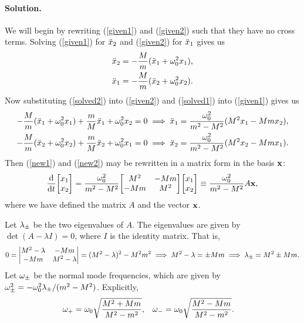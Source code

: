 \documentclass[11pt]{article}
\newcommand{\refeq}[1]{(\ref{#1})}
\newenvironment{solution}
{
    \paragraph{Solution.}
    \ignorespaces
}
{
    \bigskip
}
\begin{document}
\begin{solution}
	We will begin by rewriting \refeq{given1} and \refeq{given2} such that they have no cross terms.  Solving \refeq{given1} for $\ddot{x}_2$ and \refeq{given2} for $\ddot{x}_1$ gives us
	\begin{align}
		\ddot{x}_2 &= -\frac{M}{m} (\ddot{x}_1 + \omega_0^2 x_1), \label{solved2} \\
		\ddot{x}_1 &= -\frac{M}{m} (\ddot{x}_2 + \omega_0^2 x_2). \label{solved1}
	\end{align}
	Now substituting \refeq{solved2} into \refeq{given2} and \refeq{solved1} into \refeq{given1} gives us
	\begin{align}
		-\frac{M}{m} (\ddot{x}_1 + \omega_0^2 x_1) + \frac{m}{M} \ddot{x}_1 + \omega_0^2 x_2 = 0 &\implies \ddot{x}_1 = \frac{\omega_0^2}{m^2 - M^2} (M^2 x_1 - M m x_2), \label{new1} \\
		-\frac{M}{m} (\ddot{x}_2 + \omega_0^2 x_2) + \frac{m}{M} \ddot{x}_2 + \omega_0^2 x_1 = 0 &\implies \ddot{x}_2 = \frac{\omega_0^2}{m^2 - M^2} (M^2 x_2 - M m x_1). \label{new2}
	\end{align}
	Then \refeq{new1} and \refeq{new2} may be rewritten in a matrix form in the basis $\mathbf{x}$:
	\begin{align}
		\dv{}{t} \mqty[ \xq \\ \xw ] = \frac{\omo^2}{m^2 - M^2} \mqty[ M^2 & -Mm \\ -Mm & M^2 ] \mqty[ \xq \\ \xw ] \equiv \frac{\omo^2}{m^2 - M^2} A \vx,
	\end{align}
	where we have defined the matrix $A$ and the vector $\mathbf{x}$.
	
	Let $\lambda_\pm$ be the two eigenvalues of $A$.  The eigenvalues are given by $\det(A - \lambda I) = 0$, where $I$ is the identity matrix.  That is,
	\begin{align}
		0 = \mdet{M^2 - \lambda & -Mm \\ -Mm & M^2 - \lambda} = (M^2 - \lambda)^2 - M^2 m^2 \implies M^2 - \lambda = \pm Mm \implies \lmpm = M^2 \pm Mm.
	\end{align}
	Let $\omega_\pm$ be the normal mode frequencies, which are given by $\omega_\pm^2 = -\omega_0^2 \lambda_\pm / (m^2 - M^2)$.  Explicitly,
	\begin{align}
		\omega_+ &= \omega_0 \sqrt{\frac{M^2 + Mm}{M^2 - m^2}}, &
		\omega_- &= \omega_0 \sqrt{\frac{M^2 - Mm}{M^2 - m^2}}.
	\end{align}
\end{solution}

\newcommand{\mq}{m_1}
\newcommand{\mw}{m_2}
\newcommand{\elq}{\ell_1}
\newcommand{\elw}{\ell_2}
\end{document}
